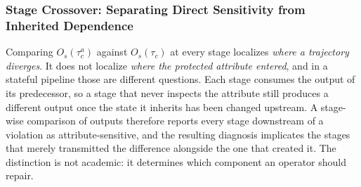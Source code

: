 
\subsubsection{Stage Crossover: Separating Direct Sensitivity from Inherited Dependence}
\label{sec:scaff}

Comparing $O_s(\tau^{a}_c)$ against $O_s(\tau_c)$ at every stage localizes \emph{where a
trajectory diverges}. It does not localize \emph{where the protected attribute entered}, and in a
stateful pipeline those are different questions. Each stage consumes the output of its
predecessor, so a stage that never inspects the attribute still produces a different output once
the state it inherits has been changed upstream. A stage-wise comparison of outputs therefore
reports every stage downstream of a violation as attribute-sensitive, and the resulting diagnosis
implicates the stages that merely transmitted the difference alongside the one that created it.
The distinction is not academic: it determines which component an operator should repair.

